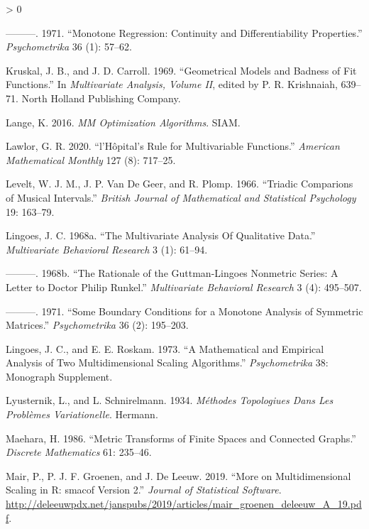 \documentclass[
  12pt,
]{book}
\newlength{\cslhangindent}
\newenvironment{CSLReferences}[2] %
 {%
  \setlength{\parindent}{0pt}
  \ifodd #1 \everypar{\setlength{\hangindent}{\cslhangindent}}\ignorespaces\fi
  \ifnum #2 > 0
  \setlength{\parskip}{#2\baselineskip}
  \fi
 }%
 {}
\theoremstyle{definition}
\theoremstyle{definition}
\theoremstyle{definition}
\theoremstyle{definition}
\theoremstyle{remark}
\begin{document}
\begin{CSLReferences}{1}{0}
\leavevmode\hypertarget{ref-kruskal_71}{}%
---------. 1971. {``{Monotone Regression: Continuity and Differentiability Properties}.''} \emph{Psychometrika} 36 (1): 57--62.

\leavevmode\hypertarget{ref-kruskal_carroll_69}{}%
Kruskal, J. B., and J. D. Carroll. 1969. {``{Geometrical Models and Badness of Fit Functions}.''} In \emph{Multivariate Analysis, Volume II}, edited by P. R. Krishnaiah, 639--71. North Holland Publishing Company.

\leavevmode\hypertarget{ref-lange_16}{}%
Lange, K. 2016. \emph{MM Optimization Algorithms}. SIAM.

\leavevmode\hypertarget{ref-lawlor_20}{}%
Lawlor, G. R. 2020. {``{l'H{ô}pital's Rule for Multivariable Functions}.''} \emph{American Mathematical Monthly} 127 (8): 717--25.

\leavevmode\hypertarget{ref-levelt_vandegeer_plomp_66}{}%
Levelt, W. J. M., J. P. Van De Geer, and R. Plomp. 1966. {``{Triadic Comparions of Musical Intervals}.''} \emph{British Journal of Mathematical and Statistical Psychology} 19: 163--79.

\leavevmode\hypertarget{ref-lingoes_68b}{}%
Lingoes, J. C. 1968a. {``{The Multivariate Analysis Of Qualitative Data}.''} \emph{Multivariate Behavioral Research} 3 (1): 61--94.

\leavevmode\hypertarget{ref-lingoes_68a}{}%
---------. 1968b. {``{The Rationale of the Guttman-Lingoes Nonmetric Series: A Letter to Doctor Philip Runkel}.''} \emph{Multivariate Behavioral Research} 3 (4): 495--507.

\leavevmode\hypertarget{ref-lingoes_71}{}%
---------. 1971. {``{Some Boundary Conditions for a Monotone Analysis of Symmetric Matrices}.''} \emph{Psychometrika} 36 (2): 195--203.

\leavevmode\hypertarget{ref-lingoes_roskam_73}{}%
Lingoes, J. C., and E. E. Roskam. 1973. {``{A Mathematical and Empirical Analysis of Two Multidimensional Scaling Algorithms}.''} \emph{Psychometrika} 38: Monograph Supplement.

\leavevmode\hypertarget{ref-lyusternik-schnirelmann_34}{}%
Lyusternik, L., and L. Schnirelmann. 1934. \emph{M{é}thodes Topologiues Dans Les Probl{è}mes Variationelle}. Hermann.

\leavevmode\hypertarget{ref-maehara_86}{}%
Maehara, H. 1986. {``{Metric Transforms of Finite Spaces and Connected Graphs}.''} \emph{Discrete Mathematics} 61: 235--46.

\leavevmode\hypertarget{ref-mair_groenen_deleeuw_A_19}{}%
Mair, P., P. J. F. Groenen, and J. De Leeuw. 2019. {``{More on Multidimensional Scaling in R: smacof Version 2}.''} \emph{Journal of Statistical Software}. \url{http://deleeuwpdx.net/janspubs/2019/articles/mair_groenen_deleeuw_A_19.pdf}.


\end{CSLReferences}
\end{document}
